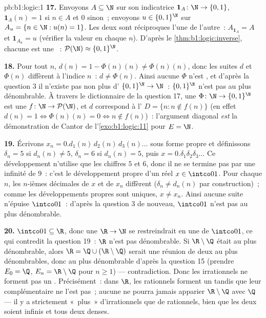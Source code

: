 \begin{solution}{pb:b1:logic:1}
\textbf{17.} Envoyons $A \subseteq \N$ sur son indicatrice $\mathbf 1_A
\colon \N \to \{0,1\}$, $\mathbf 1_A(n) = 1$ si $n \in A$ et $0$
sinon~; envoyons $u \in \{0,1\}^{\N}$ sur $A_u = \{n \in \N : u(n) =
1\}$. Les deux  sont réciproques l'une de l'autre~:
$A_{\mathbf 1_A} = A$ et $\mathbf 1_{A_u} = u$ (vérifier la valeur en
chaque $n$). D'après le \cref{thm:b1:logic:inverse}, chacune est une
~: $\mathcal{P}(\N) \approx \{0,1\}^{\N}$.

\textbf{18.} Pour tout $n$, $d(n) = 1 - \Phi(n)(n) \neq \Phi(n)(n)$,
donc les suites $d$ et $\Phi(n)$ diffèrent à l'indice $n$~: $d \neq
\Phi(n)$. Ainsi aucune $\Phi$ n'est , et d'après la question 3
il n'existe pas non plus d' $\{0,1\}^{\N} \to \N$~:
$\{0,1\}^{\N}$ n'est pas au plus dénombrable. À travers le dictionnaire
de la question 17, une  $\Phi \colon \N \to \{0,1\}^{\N}$ est
une  $f \colon \N \to \mathcal{P}(\N)$, et $d$ correspond à
l' $D = \{n : n \notin f(n)\}$ (en effet $d(n) = 1 \iff
\Phi(n)(n) = 0 \iff n \notin f(n)$)~: l'argument diagonal \emph{est} la
démonstration de Cantor de l'\cref{exo:b1:logic:11} pour $E = \N$.

\textbf{19.} Écrivons $x_n = 0.d_1(n)\,d_2(n)\,d_3(n)\dots$ sous forme
propre et définissons $\delta_n = 5$ si $d_n(n) \neq 5$, $\delta_n = 6$
si $d_n(n) = 5$, puis $x = 0.\delta_1\delta_2\delta_3\dots$ Ce
développement n'utilise que les chiffres $5$ et $6$, donc il ne se
termine pas par une infinité de $9$~: c'est le développement propre d'un
réel $x \in \intco01$. Pour chaque $n$, les $n$-ièmes décimales de $x$
et de $x_n$ diffèrent ($\delta_n \neq d_n(n)$ par construction)~; comme
les développements propres sont uniques, $x \neq x_n$. Ainsi aucune
suite n'épuise $\intco01$~: d'après la question 3 de nouveau,
$\intco01$ n'est pas au plus dénombrable.

\textbf{20.} $\intco01 \subseteq \R$, donc une  $\R \to \N$
se restreindrait en une  de $\intco01$, ce qui contredit la
question 19~: $\R$ n'est pas dénombrable. Si $\R \setminus \Q$ était au
plus dénombrable, alors $\R = \Q \cup (\R \setminus \Q)$ serait une
réunion de deux  au plus dénombrables, donc au plus dénombrable
d'après la question 15 (prendre $E_0 = \Q$, $E_n = \R \setminus \Q$ pour
$n \geq 1$) --- contradiction. Donc les irrationnels ne forment pas un
. Précisément~: dans $\R$, les rationnels forment un
 tandis que leur complémentaire ne l'est pas~;
aucune  ne pourra jamais apparier $\R \setminus \Q$ avec $\Q$
--- il y a strictement «~plus~» d'irrationnels que de rationnels, bien
que les deux  soient infinis et tous deux denses.


\end{solution}
